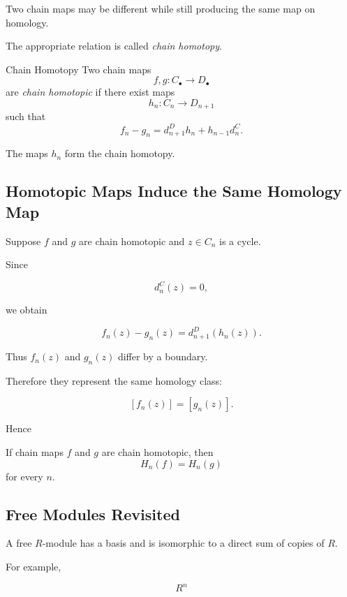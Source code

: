 Two chain maps may be different while still producing the same map on
homology.

The appropriate relation is called \emph{chain homotopy}.

\begin{definitionbox}{Chain Homotopy}
Two chain maps
\[ f,g:C_\bullet\to D_\bullet \]
are \emph{chain homotopic} if there exist maps
\[ h_n:C_n\to D_{n+1} \]
such that
\[ f_n-g_n=d_{n+1}^Dh_n+h_{n-1}d_n^C. \]
\end{definitionbox}

The maps \(h_n\) form the chain homotopy.

\subsection{Homotopic Maps Induce the Same Homology Map}
\label{subsec:homotopic-same-homology}

Suppose \(f\) and \(g\) are chain homotopic and \(z\in C_n\) is a cycle.

Since

\[ d_n^C(z)=0, \]

we obtain

\[ f_n(z)-g_n(z)=d_{n+1}^D(h_n(z)). \]

Thus \(f_n(z)\) and \(g_n(z)\) differ by a boundary.

Therefore they represent the same homology class:

\[ [f_n(z)]=[g_n(z)]. \]

Hence

\begin{theorem}
If chain maps \(f\) and \(g\) are chain homotopic, then
\[ H_n(f)=H_n(g) \]
for every \(n\).
\end{theorem}

\subsection{Free Modules Revisited}
\label{subsec:free-modules-homological}

A free \(R\)-module has a basis and is isomorphic to a direct sum of copies
of \(R\).

For example,

\[ R^n \]

